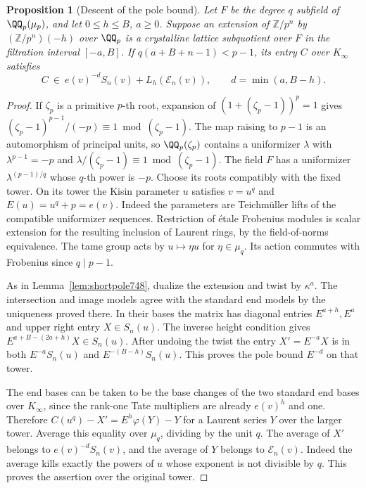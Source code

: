 \documentclass[a4paper,11pt]{article}
\newtheorem{proposition}{Proposition}[section]
\theoremstyle{definition}
\theoremstyle{remark}
\numberwithin{equation}{section}
\begin{document}
\begin{proposition}[Descent of the pole bound]
\leavevmode\label{prop:tamedescent749}
Let \(F\) be the degree \(q\) subfield of \(\QQ_p(\mu_p)\),
and let \(0\le h\le B\), \(a\ge0\). Suppose an extension of
\(\mathbb Z/p^n\) by \((\mathbb Z/p^n)(-h)\) over \(\QQ_p\)
is a crystalline lattice subquotient over \(F\) in the
filtration interval \([-a,B]\). If \(q(a+B+n-1)<p-1\), its
entry \(C\) over \(K_\infty\) satisfies
\[
     C\ \in\ e(v)^{-d} S_n(v)+L_h(\mathcal E_n(v)),
                 \qquad d=\min(a,B-h).
\]
\end{proposition}
\begin{proof}
If \(\zeta_p\) is a primitive \(p\)-th root, expansion of
\((1+(\zeta_p-1))^p=1\) gives
\((\zeta_p-1)^{p-1}/(-p)\equiv1\bmod(\zeta_p-1)\).
The map raising to \(p-1\) is an automorphism of principal
units, so \(\QQ_p(\zeta_p)\) contains a uniformizer \(\lambda\)
with \(\lambda^{p-1}=-p\) and
\(\lambda/(\zeta_p-1)\equiv1\bmod(\zeta_p-1)\).
The field \(F\) has a uniformizer \(\lambda^{(p-1)/q}\)
whose \(q\)-th power is \(-p\). Choose its roots compatibly
with the fixed tower. On its tower the Kisin parameter \(u\)
satisfies \(v=u^q\) and \(E(u)=u^q+p=e(v)\).
Indeed the parameters are Teichm\"uller lifts of the compatible
uniformizer sequences. Restriction of \'etale Frobenius modules
is scalar extension for the resulting inclusion of Laurent
rings, by the field-of-norms equivalence. The tame group acts
by \(u\mapsto\eta u\) for \(\eta\in\mu_q\). Its action commutes
with Frobenius since \(q\mid p-1\).

As in Lemma~\ref{lem:shortpole748}, dualize the extension
and twist by \(\kappa^a\). The intersection and image models
agree with the standard end models by the uniqueness proved
there. In their bases the matrix has diagonal entries
\(E^{a+h},E^a\) and upper right entry \(X\in S_n(u)\).
The inverse height condition gives
\(E^{a+B-(2a+h)}X\in S_n(u)\).
After undoing the twist the entry \(X'=E^{-a}X\) is in both
\(E^{-a}S_n(u)\) and \(E^{-(B-h)}S_n(u)\). This proves the
pole bound \(E^{-d}\) on that tower.

The end bases can be taken to be the base changes of the two
standard end bases over \(K_\infty\), since the rank-one Tate
multipliers are already \(e(v)^h\) and one. Therefore
\(C(u^q)-X'=E^h\varphi(Y)-Y\) for a Laurent series \(Y\)
over the larger tower. Average this equality over \(\mu_q\),
dividing by the unit \(q\). The average of \(X'\) belongs to
\(e(v)^{-d}S_n(v)\), and the average of \(Y\) belongs to
\(\mathcal E_n(v)\). Indeed the average kills exactly the powers
of \(u\) whose exponent is not divisible by \(q\).
This proves the assertion over the original tower.
\end{proof}
\end{document}
